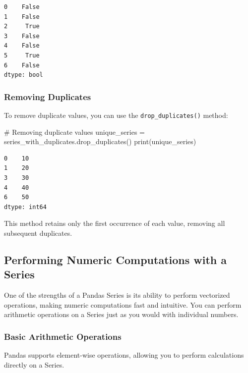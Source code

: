 \documentclass[
  letterpaper,
  DIV=11,
  numbers=noendperiod]{scrreprt}
\newenvironment{Shaded}{\begin{snugshade}}{\end{snugshade}}
\newcommand{\BuiltInTok}[1]{\textcolor[rgb]{0.00,0.23,0.31}{#1}}
\newcommand{\CommentTok}[1]{\textcolor[rgb]{0.37,0.37,0.37}{#1}}
\newcommand{\NormalTok}[1]{\textcolor[rgb]{0.00,0.23,0.31}{#1}}
\newcommand{\OperatorTok}[1]{\textcolor[rgb]{0.37,0.37,0.37}{#1}}
\begin{document}
\begin{verbatim}
0    False
1    False
2     True
3    False
4    False
5     True
6    False
dtype: bool
\end{verbatim}

\hypertarget{removing-duplicates}{%
\subsubsection{Removing Duplicates}\label{removing-duplicates}}

To remove duplicate values, you can use the \texttt{drop\_duplicates()}
method:

\begin{Shaded}
\begin{Highlighting}[]
\CommentTok{\# Removing duplicate values}
\NormalTok{unique\_series }\OperatorTok{=}\NormalTok{ series\_with\_duplicates.drop\_duplicates()}
\BuiltInTok{print}\NormalTok{(unique\_series)}
\end{Highlighting}
\end{Shaded}

\begin{verbatim}
0    10
1    20
3    30
4    40
6    50
dtype: int64
\end{verbatim}

This method retains only the first occurrence of each value, removing
all subsequent duplicates.

\hypertarget{performing-numeric-computations-with-a-series}{%
\subsection{Performing Numeric Computations with a
Series}\label{performing-numeric-computations-with-a-series}}

One of the strengths of a Pandas Series is its ability to perform
vectorized operations, making numeric computations fast and intuitive.
You can perform arithmetic operations on a Series just as you would with
individual numbers.

\hypertarget{basic-arithmetic-operations}{%
\subsubsection{Basic Arithmetic
Operations}\label{basic-arithmetic-operations}}

Pandas supports element-wise operations, allowing you to perform
calculations directly on a Series.
\end{document}
